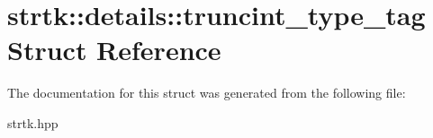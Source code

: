 \hypertarget{structstrtk_1_1details_1_1truncint__type__tag}{\section{strtk\-:\-:details\-:\-:truncint\-\_\-type\-\_\-tag Struct Reference}
\label{structstrtk_1_1details_1_1truncint__type__tag}
}


The documentation for this struct was generated from the following file\-:\begin{DoxyCompactItemize}
\item 
strtk.\-hpp\end{DoxyCompactItemize}
